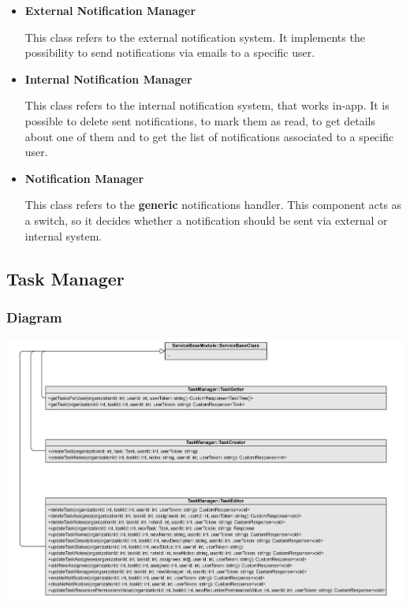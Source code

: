 \documentclass{article}
\begin{document}
\begin{itemize}

\item \textbf{External Notification Manager}

This class refers to the external notification system. It implements the possibility to send notifications via emails to a specific user. 

\item \textbf{Internal Notification Manager}

This class refers to the internal notification system, that works in-app. It is possible to delete sent notifications, to mark them as read, to get details about one of them and to get the list of notifications associated to a specific user.

\item \textbf{Notification Manager}

This class refers to the \textbf{generic} notifications handler. This component acts as a switch, so it decides whether a notification should be sent via external or internal system.
\end{itemize}

\subsection{Task Manager} %
\subsubsection{Diagram}
\includegraphics[width=\textwidth, height=\textheight, keepaspectratio]{images/class_diagram/task_manager.jpg}
\end{document}
